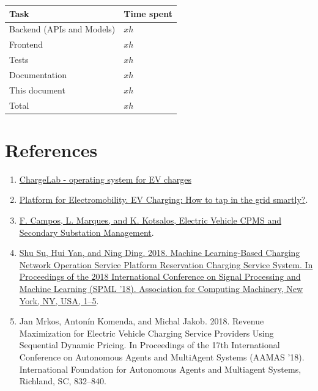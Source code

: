 \documentclass[11pt]{article}
\begin{document}
\begin{tabular}{|l|l|}
    \hline
    \textbf{Task} & \textbf{Time spent} \\
    \hline
    Backend (APIs and Models) & $x h$ \\
    \hline
    Frontend & $x h$ \\
    \hline
    Tests & $x h$ \\
    \hline
    Documentation & $x h$ \\
    \hline
    This document & $x h$ \\
    \hline
    \hline
    Total & $x h$ \\
    \hline
\end{tabular}

\newpage

\section{References}
\label{section:references}

\begin{enumerate}
    \item \href{https://www.chargelab.co/}{ChargeLab - operating system for EV charges}
    \item \href{https://www.platformelectromobility.eu/2022/05/17/ev-charging-how-to-tap-in-the-grid-smartly/}{Platform for Electromobility. EV Charging: How to tap in the grid smartly?}.
    \item \href{https://mobilityintegrationsymposium.org/wp-content/uploads/sites/10/2018/11/4A_3_Emob18_024_paper_Filipe_Campos.pdf}{F. Campos, L. Marques, and K. Kotsalos, Electric Vehicle CPMS and Secondary Substation Management}.
    \item \href{https://doi.org/10.1145/3297067.3297078}{Shu Su, Hui Yan, and Ning Ding. 2018. Machine Learning-Based Charging Network Operation Service Platform Reservation Charging Service System. In Proceedings of the 2018 International Conference on Signal Processing and Machine Learning (SPML '18). Association for Computing Machinery, New York, NY, USA, 1–5}.
    \item Jan Mrkos, Antonín Komenda, and Michal Jakob. 2018. Revenue Maximization for Electric Vehicle Charging Service Providers Using Sequential Dynamic Pricing. In Proceedings of the 17th International Conference on Autonomous Agents and MultiAgent Systems (AAMAS '18). International Foundation for Autonomous Agents and Multiagent Systems, Richland, SC, 832–840.
\end{enumerate}
\end{document}
